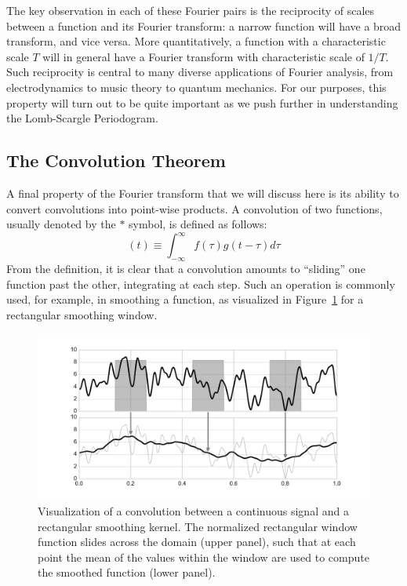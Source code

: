 \documentclass[preprint]{aastex}
\newcommand{\Fig}[1]{Figure~\ref{fig:#1}}
\newcommand{\figlabel}[1]{\label{fig:#1}}
\newcommand{\eqlabel}[1]{\label{eq:#1}}
\begin{document}
The key observation in each of these Fourier pairs is the reciprocity
of scales between a function and its Fourier transform:
a narrow function will have a broad transform, and vice versa.
More quantitatively, a function with a characteristic scale $T$ will in
general have a Fourier transform with characteristic scale of $1/T$.
Such reciprocity is central to many diverse applications of Fourier analysis,
from electrodynamics to music theory to quantum mechanics.
For our purposes, this property will turn out to be quite
important as we push further in understanding the Lomb-Scargle Periodogram.


\subsection{The Convolution Theorem}

A final property of the Fourier transform that we will discuss here is its
ability to convert convolutions into point-wise products.
A convolution of two functions, usually denoted by the $\ast$ symbol,
is defined as follows:
\begin{equation}
  [f \ast g](t) \equiv \int_{-\infty}^\infty f(\tau)g(t - \tau) d\tau
  \eqlabel{convolution-definition}
\end{equation}
From the definition, it is clear that a convolution amounts to ``sliding'' one
function past the other, integrating at each step.
Such an operation is commonly used, for example, in smoothing a function,
as visualized in \Fig{convolution} for a rectangular smoothing window.

\begin{figure}[ht]
  \centering
  \includegraphics[width=\textwidth]{fig04_Convolution_Diagram}
  \caption{Visualization of a convolution between a continuous signal and a rectangular smoothing kernel.
    The normalized rectangular window function slides across the domain (upper panel),
    such that at each point the mean of the values within the window are
    used to compute the smoothed function (lower panel).
    \figlabel{convolution}}
\end{figure}
\end{document}
